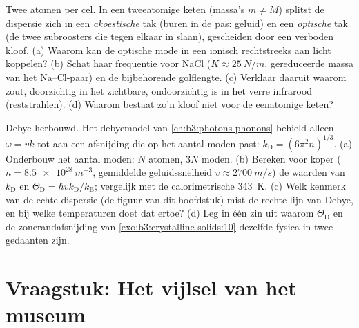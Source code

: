 \begin{exercise}[$\star\star\star$]\label{exo:b3:crystalline-solids:11}
Twee atomen per cel. In een tweeatomige keten (massa's $m \ne M$) splitst de
dispersie zich in een \emph{akoestische} tak (buren in de
pas: geluid) en een \emph{optische} tak (de twee subroosters die
tegen elkaar in slaan), gescheiden door een verboden kloof. (a) Waarom
kan de optische mode in een ionisch  rechtstreeks aan
licht koppelen? (b) Schat haar frequentie voor NaCl ($K \approx
\qty{25}{N/m}$, gereduceerde massa van het Na--Cl-paar) en de
bijbehorende golflengte. (c) Verklaar daaruit waarom zout, doorzichtig
in het zichtbare, ondoorzichtig is in het verre infrarood (reststrahlen). (d)
Waarom bestaat zo'n kloof niet voor de eenatomige keten?
\end{exercise}

\begin{exercise}[$\star\star\star$]\label{exo:b3:crystalline-solids:12}
Debye herbouwd. Het debyemodel van \cref{ch:b3:photons-phonons}
behield alleen $\omega = vk$ tot aan een afsnijding die op het aantal moden past:
$k_{\text{D}} = (6\pi^2n)^{1/3}$. (a) Onderbouw het aantal moden:
$N$ atomen, $3N$ moden. (b) Bereken voor koper ($n = \qty{8.5e28}{m^{-3}}$,
gemiddelde geluidssnelheid $v \approx \qty{2700}{m/s}$) de waarden van
$k_{\text{D}}$ en $\Theta_{\text{D}} =
\hbar vk_{\text{D}}/k_{\text{B}}$; vergelijk met de calorimetrische
\qty{343}{K}. (c) Welk kenmerk van de echte dispersie (de figuur van dit
hoofdstuk) mist de rechte lijn van Debye, en bij welke temperaturen
doet dat ertoe? (d) Leg in één zin uit waarom
$\Theta_{\text{D}}$ en de zonerandafsnijding van
\cref{exo:b3:crystalline-solids:10} dezelfde fysica in twee
gedaanten zijn.
\end{exercise}

\section{Vraagstuk: Het vijlsel van het museum}

